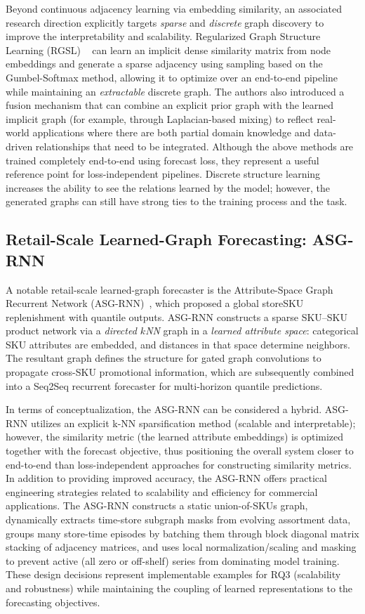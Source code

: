 Beyond continuous adjacency learning via embedding similarity, an associated research direction explicitly targets \emph{sparse} and \emph{discrete} graph discovery to improve the interpretability and scalability. Regularized Graph Structure Learning (RGSL) ~\cite{Yu20222362} can learn an implicit dense similarity matrix from node embeddings and generate a sparse adjacency using sampling based on the Gumbel-Softmax method, allowing it to optimize over an end-to-end pipeline while maintaining an \textit{extractable} discrete graph. The authors also introduced a fusion mechanism that can combine an explicit prior graph with the learned implicit graph (for example, through Laplacian-based mixing) to reflect real-world applications where there are both partial domain knowledge and data-driven relationships that need to be integrated. Although the above methods  are trained completely end-to-end using forecast loss, they represent a useful reference point for loss-independent pipelines. Discrete structure learning increases the ability to see the relations learned by the model; however, the generated graphs can still have strong ties to the training process and the task.

\subsection{Retail-Scale Learned-Graph Forecasting: ASG-RNN}
\label{sec:pathb-asg-rnn}

A notable retail-scale learned-graph forecaster is the Attribute-Space Graph Recurrent Network (ASG-RNN)~\cite{MA2024123727}, which proposed a global storeSKU replenishment with quantile outputs. ASG-RNN constructs a sparse SKU--SKU product network via a \emph{directed $k$NN} graph in a \emph{learned attribute space}: categorical SKU attributes are embedded, and distances in that space determine neighbors. The resultant graph defines the structure for gated graph convolutions to propagate cross-SKU promotional information, which are subsequently combined into a Seq2Seq recurrent forecaster for multi-horizon quantile predictions.

In terms of conceptualization, the ASG-RNN can be considered a hybrid. ASG-RNN utilizes an explicit k-NN sparsification method (scalable and interpretable); however, the similarity metric (the learned attribute embeddings) is optimized together with the forecast objective, thus positioning the overall system closer to end-to-end  than loss-independent approaches for constructing similarity metrics. In addition to providing improved accuracy, the ASG-RNN offers practical engineering strategies related to scalability and efficiency for commercial applications. The ASG-RNN constructs a static union-of-SKUs graph, dynamically extracts time-store subgraph masks from evolving assortment data, groups many store-time episodes by batching them through block diagonal matrix stacking of adjacency matrices, and uses local normalization/scaling and masking to prevent active (all zero or off-shelf) series from dominating model training. These design decisions represent implementable examples for RQ3 (scalability and robustness) while maintaining the coupling of learned representations to the forecasting objectives.
